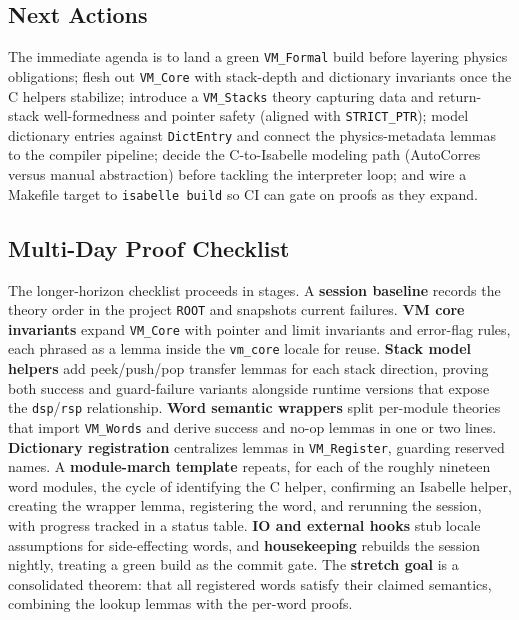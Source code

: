 \subsection{Next Actions}

The immediate agenda is to land a green \texttt{VM\_Formal} build before layering
physics obligations; flesh out \texttt{VM\_Core} with stack-depth and dictionary
invariants once the C helpers stabilize; introduce a \texttt{VM\_Stacks} theory
capturing data and return-stack well-formedness and pointer safety (aligned with
\texttt{STRICT\_PTR}); model dictionary entries against \texttt{DictEntry} and connect
the physics-metadata lemmas to the compiler pipeline; decide the C-to-Isabelle
modeling path (AutoCorres versus manual abstraction) before tackling the interpreter
loop; and wire a Makefile target to \texttt{isabelle build} so CI can gate on proofs
as they expand.

\subsection{Multi-Day Proof Checklist}

The longer-horizon checklist proceeds in stages. A \textbf{session baseline} records
the theory order in the project \texttt{ROOT} and snapshots current failures.
\textbf{VM core invariants} expand \texttt{VM\_Core} with pointer and limit
invariants and error-flag rules, each phrased as a lemma inside the \texttt{vm\_core}
locale for reuse. \textbf{Stack model helpers} add peek/push/pop transfer lemmas for
each stack direction, proving both success and guard-failure variants alongside
runtime versions that expose the \texttt{dsp}/\texttt{rsp} relationship.
\textbf{Word semantic wrappers} split per-module theories that import
\texttt{VM\_Words} and derive success and no-op lemmas in one or two lines.
\textbf{Dictionary registration} centralizes lemmas in \texttt{VM\_Register},
guarding reserved names. A \textbf{module-march template} repeats, for each of the
roughly nineteen word modules, the cycle of identifying the C helper, confirming an
Isabelle helper, creating the wrapper lemma, registering the word, and rerunning the
session, with progress tracked in a status table. \textbf{IO and external hooks} stub
locale assumptions for side-effecting words, and \textbf{housekeeping} rebuilds the
session nightly, treating a green build as the commit gate. The \textbf{stretch goal}
is a consolidated theorem: that all registered words satisfy their claimed semantics,
combining the lookup lemmas with the per-word proofs.

